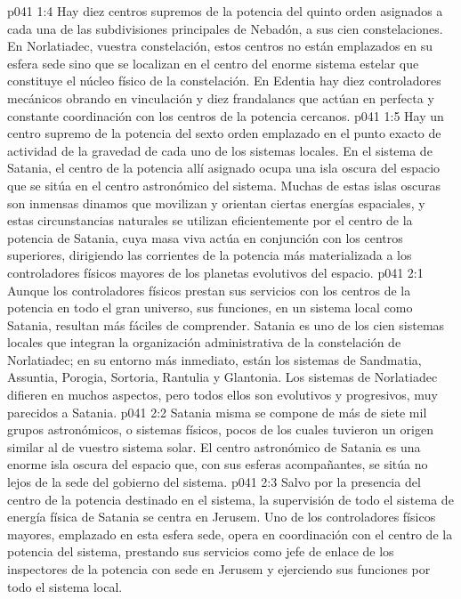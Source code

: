 \vs p041 1:4 Hay diez centros supremos de la potencia del quinto orden asignados a cada una de las subdivisiones principales de Nebadón, a sus cien constelaciones. En Norlatiadec, vuestra constelación, estos centros no están emplazados en su esfera sede sino que se localizan en el centro del enorme sistema estelar que constituye el núcleo físico de la constelación. En Edentia hay diez controladores mecánicos obrando en vinculación y diez frandalancs que actúan en perfecta y constante coordinación con los centros de la potencia cercanos.
\vs p041 1:5 Hay un centro supremo de la potencia del sexto orden emplazado en el punto exacto de actividad de la gravedad de cada uno de los sistemas locales. En el sistema de Satania, el centro de la potencia allí asignado ocupa una isla oscura del espacio que se sitúa en el centro astronómico del sistema. Muchas de estas islas oscuras son inmensas dinamos que movilizan y orientan ciertas energías espaciales, y estas circunstancias naturales se utilizan eficientemente por el centro de la potencia de Satania, cuya masa viva actúa en conjunción con los centros superiores, dirigiendo las corrientes de la potencia más materializada a los controladores físicos mayores de los planetas evolutivos del espacio.
\vs p041 2:1 Aunque los controladores físicos prestan sus servicios con los centros de la potencia en todo el gran universo, sus funciones, en un sistema local como Satania, resultan más fáciles de comprender. Satania es uno de los cien sistemas locales que integran la organización administrativa de la constelación de Norlatiadec; en su entorno más inmediato, están los sistemas de Sandmatia, Assuntia, Porogia, Sortoria, Rantulia y Glantonia. Los sistemas de Norlatiadec difieren en muchos aspectos, pero todos ellos son evolutivos y progresivos, muy parecidos a Satania.
\vs p041 2:2 Satania misma se compone de más de siete mil grupos astronómicos, o sistemas físicos, pocos de los cuales tuvieron un origen similar al de vuestro sistema solar. El centro astronómico de Satania es una enorme isla oscura del espacio que, con sus esferas acompañantes, se sitúa no lejos de la sede del gobierno del sistema.
\vs p041 2:3 \pc Salvo por la presencia del centro de la potencia destinado en el sistema, la supervisión de todo el sistema de energía física de Satania se centra en Jerusem. Uno de los controladores físicos mayores, emplazado en esta esfera sede, opera en coordinación con el centro de la potencia del sistema, prestando sus servicios como jefe de enlace de los inspectores de la potencia con sede en Jerusem y ejerciendo sus funciones por todo el sistema local.
